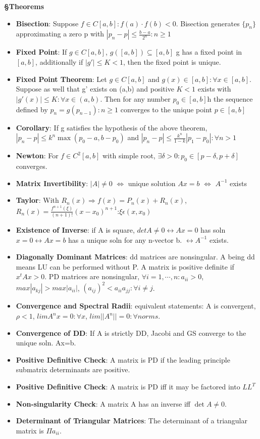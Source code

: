 \documentclass{article}
\begin{document}
\begin{tcolorbox}[colframe=black,colback=white,boxrule=0.3pt,arc=1pt,
left=0pt,right=0pt,top=0pt,bottom=0pt]
\begin{minipage}[t]{0.49\textwidth}
\textbf{\S Theorems}
\begin{itemize}
\item \textbf{Bisection}: Suppose $f\in C[a,b]:f(a)\cdot f(b) <0$. Bisection generates $\{p_n\}$ approximating a zero p with $|p_n-p|\le \frac{b-a}{2^n}:n\ge 1$
\item \textbf{Fixed Point}: If $g\in C[a,b]$, $g([a,b])\subseteq[a,b]$ g has a fixed point in $[a,b]$, additionally if $|g'|\leq K<1$, then the fixed point is unique.
\item \textbf{Fixed Point Theorem}: Let $g\in C[a,b]$ and $g(x)\in[a,b]:\forall x\in[a,b]$. Suppose as well that g' exists on (a,b) and positive $K<1$ exists with $|g'(x)|\le K:\forall x\in (a,b)$. Then for any number $p_0 \in [a,b]$h the sequence defined by $p_n=g(p_{n-1}):n\ge1$ converges to the unique point $p\in[a,b]$
\item \textbf {Corollary}: If g satisfies the hypothesis of the above theorem, $|p_n-p| \le k^n\max(p_0-a,b-p_0)$ and $|p_n-p|\le\frac{k^n}{1-k}|p_1-p_0|:\forall n>1$
\item \textbf{Newton}: For $f\in C^2[a,b]$ with simple root, $\exists\delta>0:p_0\in[p-\delta,p+\delta]$ converges.
\item \textbf{Matrix Invertibility}: $|A|\neq0$ $\Leftrightarrow$ unique solution $Ax=b$ $\Leftrightarrow$ $A^{-1}$ exists
\item \textbf{Taylor}: With $R_n(x)\Rightarrow f(x)=P_n(x)+R_n(x)$, $R_n(x)=\frac{f^{n+1}(\xi)}{(n+1)!}(x-x_0)^{n+1}$:$\xi \epsilon (x, x_0)$
\item \textbf{Existence of Inverse}: if A is square, $detA\ne 0 \leftrightarrow Ax=0$ has soln $x=0 \leftrightarrow Ax=b$ has a unique soln for any n-vector b. $\leftrightarrow A^{-1}$ exists.
\item \textbf{Diagonally Dominant Matrices}: dd matrices are nonsingular. A being dd means LU can be performed without P. A matrix is positive definite if $x^tAx>0$. PD matrices are nonsingular, $\forall i=1,\cdots,n: a_{ii} > 0$, $max|a_{kj}| > max|a_{ii}|$, $(a_{ij})^2<a_{ii}a_{jj}:\forall i\neq j$.
\item \textbf{Convergence and Spectral Radii}: equivalent statements: A is convergent, $\rho <1$, $lim A^nx=0:\forall x$, $lim ||A^n|| = 0 :\forall norms$.
\item \textbf{Convergence of DD}: If A is strictly DD, Jacobi and GS converge to the unique soln. Ax=b.
\item \textbf{Positive Definitive Check}: A matrix is PD if the leading principle submatrix determinants are positive.
\item \textbf{Positive Definitive Check}: A matrix is PD iff it may be factored into $LL^T$
\item \textbf{Non-singularity Check}: A matrix A has an inverse iff $\det A \ne 0$.
\item \textbf{Determinant of Triangular Matrices}: The determinant of a triangular matrix is $\Pi a_{ii}$.
\end{itemize}


\end{minipage}
\end{tcolorbox}
\end{document}
